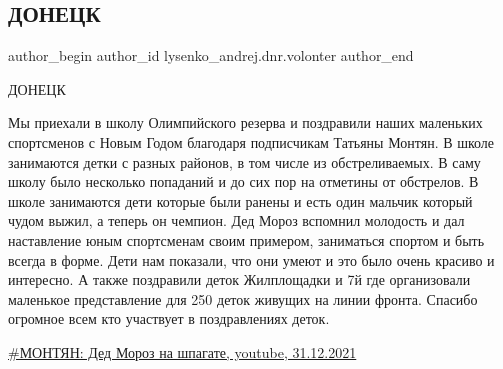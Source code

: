  
 
 
 
 
 
\subsection{ДОНЕЦК}
\label{sec:31_12_2021.fb.lysenko_andrej.dnr.volonter.1.doneck}
 
\ifcmt
 author_begin
   author_id lysenko_andrej.dnr.volonter
 author_end
\fi

ДОНЕЦК

Мы приехали в школу Олимпийского резерва и поздравили наших маленьких
спортсменов с Новым Годом благодаря подписчикам Татьяны Монтян. В школе
занимаются детки с разных районов, в том числе из обстреливаемых. В саму школу
было несколько попаданий и до сих пор на отметины от обстрелов. В школе
занимаются дети которые были ранены и есть один мальчик который чудом выжил, а
теперь он чемпион. Дед Мороз вспомнил молодость и дал наставление юным
спортсменам своим примером, заниматься спортом и быть всегда в форме. Дети нам
показали, что они умеют и это было очень красиво и интересно. А также
поздравили деток Жилплощадки и 7й где организовали маленькое представление для
250 деток живущих на линии фронта. Спасибо огромное всем кто участвует в
поздравлениях деток.

\href{https://www.youtube.com/watch?v=nwsn1f5F2mc}{\#МОНТЯН: Дед Мороз на шпагате, youtube, 31.12.2021}

